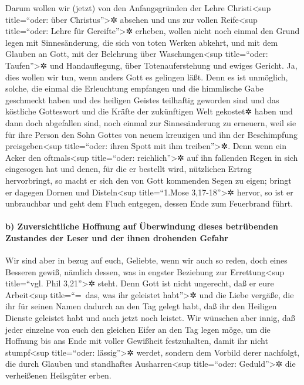  Darum wollen wir (jetzt) von den Anfangsgründen der Lehre
Christi\textless sup title=``oder: über Christus''\textgreater✲ absehen
und uns zur vollen Reife\textless sup title=``oder: Lehre für
Gereifte''\textgreater✲ erheben, wollen nicht noch einmal den Grund
legen mit Sinnesänderung, die sich von toten Werken abkehrt, und mit dem
Glauben an Gott,  mit der Belehrung über
Waschungen\textless sup title=``oder: Taufen''\textgreater✲ und
Handauflegung, über Totenauferstehung und ewiges Gericht. 
Ja, dies wollen wir tun, wenn anders Gott es gelingen läßt.
 Denn es ist unmöglich, solche, die einmal die Erleuchtung
empfangen und die himmlische Gabe geschmeckt haben und des heiligen
Geistes teilhaftig geworden sind  und das köstliche
Gotteswort und die Kräfte der zukünftigen Welt gekostet✲ haben
 und dann doch abgefallen sind, noch einmal zur
Sinnesänderung zu erneuern, weil sie für ihre Person den Sohn Gottes von
neuem kreuzigen und ihn der Beschimpfung preisgeben\textless sup
title=``oder: ihren Spott mit ihm treiben''\textgreater✲. 
Denn wenn ein Acker den oftmals\textless sup title=``oder:
reichlich''\textgreater✲ auf ihn fallenden Regen in sich eingesogen hat
und denen, für die er bestellt wird, nützlichen Ertrag hervorbringt, so
macht er sich den von Gott kommenden Segen zu eigen; 
bringt er dagegen Dornen und Disteln\textless sup title=``1.Mose
3,17-18''\textgreater✲ hervor, so ist er unbrauchbar und geht dem Fluch
entgegen, dessen Ende zum Feuerbrand führt.

\hypertarget{b-zuversichtliche-hoffnung-auf-uxfcberwindung-dieses-betruxfcbenden-zustandes-der-leser-und-der-ihnen-drohenden-gefahr}{%
\paragraph{b) Zuversichtliche Hoffnung auf Überwindung dieses
betrübenden Zustandes der Leser und der ihnen drohenden
Gefahr}\label{b-zuversichtliche-hoffnung-auf-uxfcberwindung-dieses-betruxfcbenden-zustandes-der-leser-und-der-ihnen-drohenden-gefahr}}

 Wir sind aber in bezug auf euch, Geliebte, wenn wir auch
so reden, doch eines Besseren gewiß, nämlich dessen, was in engster
Beziehung zur Errettung\textless sup title=``vgl. Phil
3,21''\textgreater✲ steht.  Denn Gott ist nicht
ungerecht, daß er eure Arbeit\textless sup title=``=~das, was ihr
geleistet habt''\textgreater✲ und die Liebe vergäße, die ihr für seinen
Namen dadurch an den Tag gelegt habt, daß ihr den Heiligen Dienste
geleistet habt und auch jetzt noch leistet.  Wir wünschen
aber innig, daß jeder einzelne von euch den gleichen Eifer an den Tag
legen möge, um die Hoffnung bis ans Ende mit voller Gewißheit
festzuhalten,  damit ihr nicht stumpf\textless sup
title=``oder: lässig''\textgreater✲ werdet, sondern dem Vorbild derer
nachfolgt, die durch Glauben und standhaftes Ausharren\textless sup
title=``oder: Geduld''\textgreater✲ die verheißenen Heilsgüter erben.

